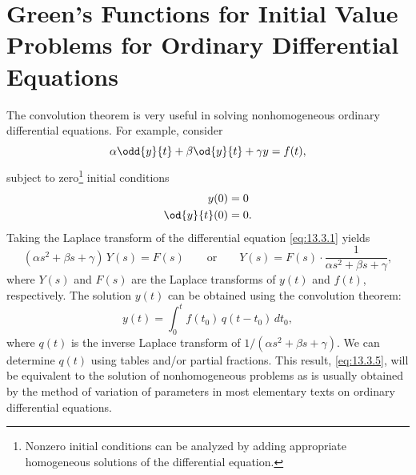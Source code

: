 \section{Green's Functions for Initial Value Problems for Ordinary Differential Equations}
\label{sec:13.3}

The convolution theorem is very useful in solving nonhomogeneous ordinary differential equations.  For example, consider
\begin{equation}
\alpha\odd{y}{t} + \beta\od{y}{t} + \gamma y = f(t),
\label{eq:13.3.1}
\end{equation}
subject to zero\footnote{Nonzero initial conditions can be analyzed by adding appropriate homogeneous solutions of the differential equation.} initial conditions
\begin{align}
y(0) &= 0 \label{eq:13.3.2}\\
\od{y}{t}(0) &= 0. \label{eq:13.3.3}
\end{align}
Taking the Laplace transform of the differential equation \eqref{eq:13.3.1} yields
\begin{equation}
(\alpha s^2 + \beta s + \gamma)\,Y(s) = F(s)
\qquad\text{or}\qquad
Y(s) = F(s)\cdot\frac{1}{\alpha s^2 + \beta s + \gamma},
\label{eq:13.3.4}
\end{equation}
where $Y(s)$ and $F(s)$ are the Laplace transforms of $y(t)$ and $f(t)$, respectively.  The solution $y(t)$ can be obtained using the convolution theorem:
\begin{equation}
y(t) = \int_0^t f(t_0)\,q(t-t_0)\,dt_0,
\label{eq:13.3.5}
\end{equation}
where $q(t)$ is the inverse Laplace transform of $1/(\alpha s^2+\beta s+\gamma)$.  We can determine $q(t)$ using tables and/or partial fractions.  This result, \eqref{eq:13.3.5}, will be equivalent to the solution of nonhomogeneous problems as is usually obtained by the method of variation of parameters in most elementary texts on ordinary differential equations.

